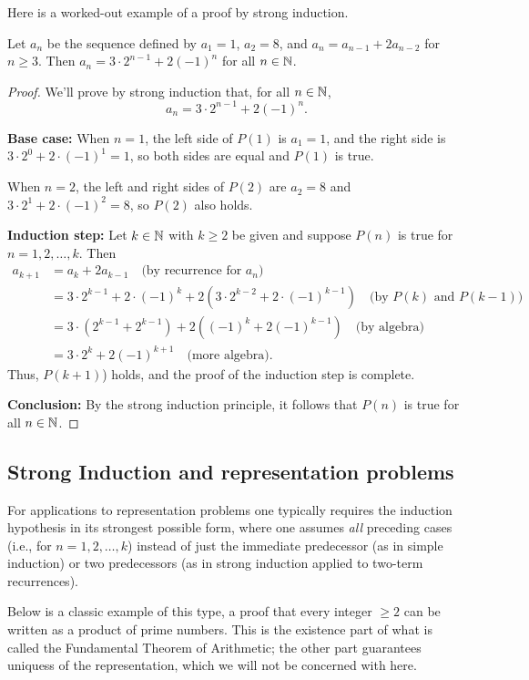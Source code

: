 Here is a worked-out example of a proof by strong induction.


\begin{prop}{}
Let $a_n$ be the sequence defined by 
$a_1=1$, $a_2=8$, and $a_n=a_{n-1}+2a_{n-2}$ for $n\ge3$.
Then
$a_n=3\cdot 2^{n-1}+2(-1)^n$ for all $n\in\mathbb{N}$.
\end{prop}

\begin{proof}
We'll prove by strong induction that, for all $n\in\mathbb{N}$, 
\[
\tag{$P(n)$}
a_n=3\cdot 2^{n-1}+2(-1)^n.
\]

\textbf{Base case:} 
When $n=1$, the left side of $P(1)$ is $a_1 =1$, and
the right side is $3\cdot 2^{0}+2\cdot(-1)^1=1$,
so both sides are equal and $P(1)$ is
true. 

When $n=2$, the left and right sides of $P(2)$ are
$a_2=8$ and $3\cdot 2^1+2\cdot(-1)^2=8$, so $P(2)$ also holds.


\textbf{Induction step:} Let $k\in\mathbb{N}$ with $k\ge2$ be given and suppose 
$P(n)$ is true for $n=1,2,\dots,k$. Then
\begin{align*}
a_{k+1}&=a_{k}+2a_{k-1}
\quad \text{(by recurrence for $a_n$)}
\\
&=
3\cdot 2^{k-1}+2\cdot(-1)^k
+2\left(3\cdot 2^{k-2}+2\cdot(-1)^{k-1}\right)
\quad \text{(by $P(k)$ and $P(k-1)$)}
\\
&=
3\cdot \left(2^{k-1}+2^{k-1}\right) 
+2\left((-1)^k+2(-1)^{k-1}\right)
\quad \text{(by algebra)}
\\
&=
3\cdot 2^k+2(-1)^{k+1}
\quad \text{(more algebra).}
\end{align*}
Thus, $P(k+1)$) holds, and the proof of the induction step is complete. 

\textbf{Conclusion:} By the strong induction principle,  it follows that
$P(n)$ is true for all $n\in\mathbb{N}$.  
\end{proof}

\subsection*{Strong Induction and representation problems}
For applications to representation problems one 
typically requires the induction hypothesis in its strongest possible
form, where one assumes \emph{all} preceding
cases (i.e., for $n=1,2,\dots,k$) instead of just the immediate
predecessor (as in simple induction) or two predecessors (as in strong induction applied to two-term recurrences). 

Below is a classic example of this type, a proof that every integer
$\ge2$ can be written as a product of prime numbers. This is the
existence part of what is called the Fundamental Theorem of Arithmetic;
the other part guarantees uniquess of the representation, which we will
not be concerned with here.  

